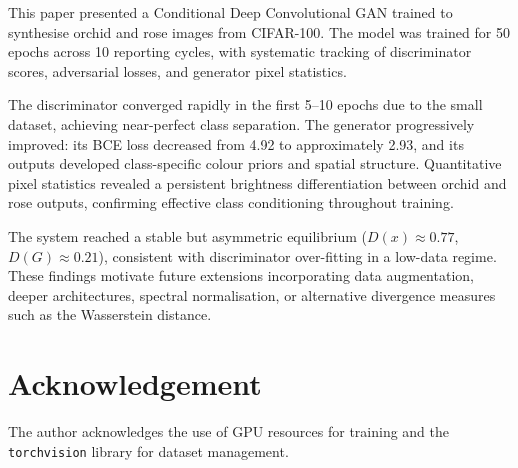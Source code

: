 \documentclass[conference]{IEEEtran}
\begin{document}
This paper presented a Conditional Deep Convolutional GAN trained to synthesise orchid and rose images from CIFAR-100. The model was trained for 50 epochs across 10 reporting cycles, with systematic tracking of discriminator scores, adversarial losses, and generator pixel statistics.

The discriminator converged rapidly in the first 5--10 epochs due to the small dataset, achieving near-perfect class separation. The generator progressively improved: its BCE loss decreased from 4.92 to approximately 2.93, and its outputs developed class-specific colour priors and spatial structure. Quantitative pixel statistics revealed a persistent brightness differentiation between orchid and rose outputs, confirming effective class conditioning throughout training.

The system reached a stable but asymmetric equilibrium ($D(x) \approx 0.77$, $D(G) \approx 0.21$), consistent with discriminator over-fitting in a low-data regime. These findings motivate future extensions incorporating data augmentation, deeper architectures, spectral normalisation, or alternative divergence measures such as the Wasserstein distance.

\section*{Acknowledgement}

The author acknowledges the use of GPU resources for training and the \texttt{torchvision} library for dataset management.
\end{document}
